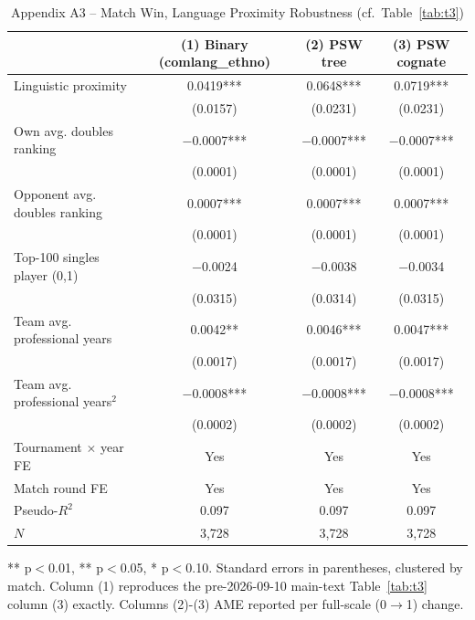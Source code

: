 \documentclass[10pt]{article}
\begin{document}
\begin{table}[htbp]
\centering
\caption{Appendix A3 -- Match Win, Language Proximity Robustness (cf.\ Table~\ref{tab:t3}) \label{tab:a3}}
\begin{threeparttable}
\begin{tabular}{lccc}
\toprule
 & (1) Binary (comlang\_ethno) & (2) PSW tree & (3) PSW cognate \\
\midrule
Linguistic proximity & 0.0419*** & 0.0648*** & 0.0719*** \\
 & (0.0157) & (0.0231) & (0.0231) \\
Own avg. doubles ranking & $-$0.0007*** & $-$0.0007*** & $-$0.0007*** \\
 & (0.0001) & (0.0001) & (0.0001) \\
Opponent avg. doubles ranking & 0.0007*** & 0.0007*** & 0.0007*** \\
 & (0.0001) & (0.0001) & (0.0001) \\
Top-100 singles player (0,1)& $-$0.0024 & $-$0.0038 & $-$0.0034 \\
 & (0.0315) & (0.0314) & (0.0315) \\
Team avg. professional years  & 0.0042** & 0.0046*** & 0.0047*** \\
 & (0.0017) & (0.0017) & (0.0017) \\
Team avg. professional years$^2$  & $-$0.0008*** & $-$0.0008*** & $-$0.0008*** \\
 & (0.0002) & (0.0002) & (0.0002) \\
\midrule
Tournament $\times$ year FE & Yes & Yes & Yes \\
Match round FE & Yes & Yes & Yes \\
Pseudo-$R^2$ & 0.097 & 0.097 & 0.097 \\
$N$ & 3,728 & 3,728 & 3,728 \\
\bottomrule
\end{tabular}
\begin{tablenotes}
\small
\item *** p$<$0.01, ** p$<$0.05, * p$<$0.10. Standard errors in parentheses, clustered by match. Column (1) reproduces the pre-2026-09-10 main-text Table~\ref{tab:t3} column (3) exactly. Columns (2)-(3) AME reported per full-scale (0$\to$1) change.
\end{tablenotes}
\end{threeparttable}
\end{table}
\end{document}
